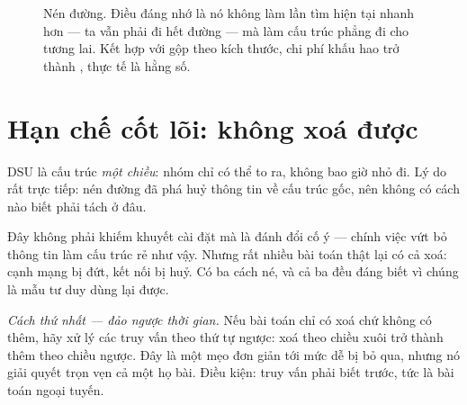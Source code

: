 \documentclass[../../algorithm.tex]{subfiles}
\begin{document}
\begin{figure}[H]\centering
{}
\caption{Nén đường. Điều đáng nhớ là nó không làm lần tìm hiện tại nhanh hơn --- ta vẫn phải đi hết đường --- mà làm cấu trúc phẳng đi cho tương lai. Kết hợp với gộp theo kích thước, chi phí khấu hao trở thành , thực tế là hằng số.}
\label{fig:dsu}
\end{figure}

\section{Hạn chế cốt lõi: không xoá được}

DSU là cấu trúc \emph{một chiều}: nhóm chỉ có thể to ra, không bao giờ nhỏ đi. Lý do rất trực tiếp: nén đường đã phá huỷ thông tin về cấu trúc gốc, nên không có cách nào biết phải tách ở đâu.

Đây không phải khiếm khuyết cài đặt mà là đánh đổi cố ý --- chính việc vứt bỏ thông tin làm cấu trúc rẻ như vậy. Nhưng rất nhiều bài toán thật lại có cả xoá: cạnh mạng bị đứt, kết nối bị huỷ. Có ba cách né, và cả ba đều đáng biết vì chúng là mẫu tư duy dùng lại được.

\emph{Cách thứ nhất --- đảo ngược thời gian.} Nếu bài toán chỉ có xoá chứ không có thêm, hãy xử lý các truy vấn theo thứ tự ngược: xoá theo chiều xuôi trở thành thêm theo chiều ngược. Đây là một mẹo đơn giản tới mức dễ bị bỏ qua, nhưng nó giải quyết trọn vẹn cả một họ bài. Điều kiện: truy vấn phải biết trước, tức là bài toán ngoại tuyến.
\end{document}

